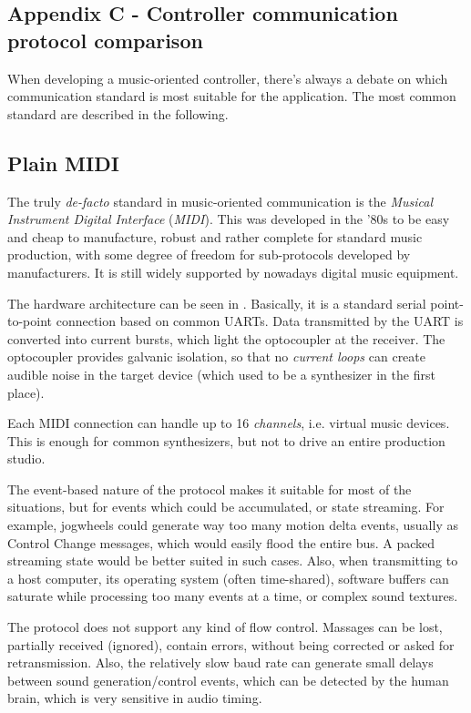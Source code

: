 \documentclass[a4paper,10pt]{article}
\begin{document}
\begin{multicols}{2}
\section{Appendix C - Controller communication protocol comparison}

When developing a music-oriented controller, there's always a debate on which
communication standard is most suitable for the application. The most common
standard are described in the following.


\subsection{Plain MIDI}

The truly \emph{de-facto} standard in music-oriented communication is the
\emph{Musical Instrument Digital Interface} (\emph{MIDI}). This was
developed in the '80s to be easy and cheap to manufacture, robust and rather
complete for standard music production, with some degree of freedom for
sub-protocols developed by manufacturers. It is still widely supported by
nowadays digital music equipment.

The hardware architecture can be seen in \CITEME. Basically, it is a standard
serial point-to-point connection based on common UARTs. Data transmitted by
the UART is converted into current bursts, which light the optocoupler at the
receiver. The optocoupler provides galvanic isolation, so that no
\emph{current loops} can create audible noise in the target device (which
used to be a synthesizer in the first place).

Each MIDI connection can handle up to 16 \emph{channels}, i.e. virtual music
devices. This is enough for common synthesizers, but not to drive an entire
production studio.

The event-based nature of the protocol makes it suitable for most of the
situations, but for events which could be accumulated, or state streaming.
For example, jogwheels could generate way too many motion delta events, usually
as Control Change messages, which would easily flood the entire bus. A packed
streaming state would be better suited in such cases.
Also, when transmitting to a host computer, its operating system (often
time-shared), software buffers can saturate while processing too many events
at a time, or complex sound textures.

The protocol does not support any kind of flow control. Massages can be lost,
partially received (ignored), contain errors, without being corrected or asked
for retransmission. Also, the relatively slow baud rate can generate small
delays between sound generation/control events, which can be detected by
the human brain, which is very sensitive in audio timing.



\end{multicols}
\end{document}
